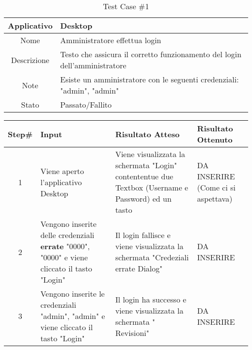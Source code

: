
\setcounter{table}{0}
\begin{table}[H]
    \footnotesize
    \caption{Test Case \#1}
    \begin{tabularx}{\textwidth}{|c|X|}
        \hline
        Applicativo & Desktop\\
        \hline
        Nome & Amministratore effettua login  \\
        \hline
        Descrizione & Testo che assicura il corretto funzionamento del login dell'amministratore\\
        \hline
        Note & Esiste un amministratore con le seguenti credenziali: "admin", "admin" \\
        \hline
        Stato & Passato/Fallito\\
        \hline

    \end{tabularx}
    \setlength{\tabcolsep}{8pt}
    \renewcommand{\arraystretch}{1.5}
\end{table}

\begin{table}[H]
    \footnotesize
    \begin{tabularx}{\textwidth}{|c|X|X|X|}
        \hline
        Step\# & Input & Risultato Atteso & Risultato Ottenuto \\
        \hline
         1 & Viene aperto l'applicativo Desktop  
         & Viene visualizzata la schermata "Login" contententue due Textbox (Username e Password) 
         ed un tasto
         &DA INSERIRE (Come ci si aspettava)\\
          \hline
        2 & Vengono inserite delle credenziali \textbf{errate} "0000", "0000" e viene cliccato 
        il tasto "Login" 
        & Il login fallisce e viene visualizzata la schermata "Credeziali errate Dialog" 
        & DA INSERIRE\\
         \hline
        3 & Vengono inserite le credenziali "admin", "admin" e viene cliccato 
        il tasto "Login" 
        & Il login ha successo e viene visualizzata la schermata "
        Revisioni" 
        & DA INSERIRE\\
         \hline
                 
    \end{tabularx}
\end{table}
    
       

